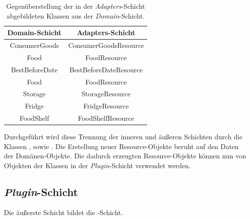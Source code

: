 \begin{table}[H]
    \centering
\begin{tabular}[h]{|c|c|}
	\hline
	\textbf{Domain-Schicht} & \textbf{Adapters-Schicht} \\
	\hline
	ConsumerGoods & ConsumerGoodsResource \\
	Food & FoodResource \\
	BestBeforeDate & BestBeforeDateResource \\
	Food & FoodResource \\
	Storage & StorageResource \\
	Fridge & FridgeResource \\
	FoodShelf & FoodShelfResource \\
    \hline
\end{tabular}
    \caption{Gegenüberstellung der in der \textit{Adapters}-Schicht abgebildeten Klassen aus der \textit{Domain}-Schicht.}
    \label{clean-architecture>klassen-adapters}
\end{table}

Durchgeführt wird diese Trennung der inneren und äußeren Schichten durch die Klassen \href{https://github.com/lucasmerkel/dhbw-advancedswe-programmentwurf/blob/d5c89113d12c3b877ddc4d6a99225b277ddd468f/swe_programmentwurf/consumergoods-inventory-planner/1-cip-adapters/src/main/java/de/dhbw/cip/adapters/ConsumerGoodsToConsumerGoodsResourceMapper.java}{}, \href{https://github.com/lucasmerkel/dhbw-advancedswe-programmentwurf/blob/d5c89113d12c3b877ddc4d6a99225b277ddd468f/swe_programmentwurf/consumergoods-inventory-planner/1-cip-adapters/src/main/java/de/dhbw/cip/adapters/FridgeToFridgeResourceMapper.java}{} sowie \href{https://github.com/lucasmerkel/dhbw-advancedswe-programmentwurf/blob/d5c89113d12c3b877ddc4d6a99225b277ddd468f/swe_programmentwurf/consumergoods-inventory-planner/1-cip-adapters/src/main/java/de/dhbw/cip/adapters/FoodShelfToFoodShelfRessourceMapper.java}{}.
Die Erstellung neuer Resource-Objekte beruht auf den Daten der Domänen-Objekte.
Die dadurch erzeugten Resource-Objekte können nun von Objekten der Klassen in der \textit{Plugin}-Schicht verwendet werden.

\subsection*{\textit{Plugin}-Schicht}
Die äußerste Schicht bildet die \href{https://github.com/lucasmerkel/dhbw-advancedswe-programmentwurf/tree/main/swe_programmentwurf/consumergoods-inventory-planner/0-cip-plugins}{}-Schicht.

